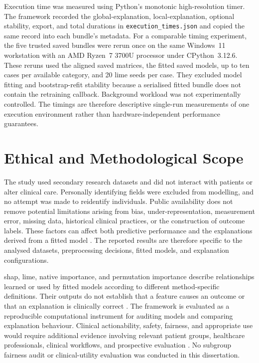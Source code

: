 Execution time was measured using Python's monotonic high-resolution timer. The framework recorded the global-explanation, local-explanation, optional stability, export, and total durations in \texttt{execution\_times.json} and copied the same record into each bundle's metadata. For a comparable timing experiment, the five trusted saved bundles were rerun once on the same Windows~11 workstation with an AMD Ryzen~7 3700U processor under CPython~3.12.6. These reruns used the aligned saved matrices, the fitted saved models, up to ten cases per available category, and 20 \gls{lime} seeds per case. They excluded model fitting and bootstrap-refit stability because a serialised fitted bundle does not contain the retraining callback. Background workload was not experimentally controlled. The timings are therefore descriptive single-run measurements of one execution environment rather than hardware-independent performance guarantees.

\section{Ethical and Methodological Scope}

The study used secondary research datasets and did not interact with patients or alter clinical care. Personally identifying fields were excluded from modelling, and no attempt was made to reidentify individuals. Public availability does not remove potential limitations arising from bias, under-representation, measurement error, missing data, historical clinical practices, or the construction of outcome labels. These factors can affect both predictive performance and the explanations derived from a fitted model \citep{moons_probastai_2025}. The reported results are therefore specific to the analysed datasets, preprocessing decisions, fitted models, and explanation configurations.

\gls{shap}, \gls{lime}, native importance, and permutation importance describe relationships learned or used by fitted models according to different method-specific definitions. Their outputs do not establish that a feature causes an outcome or that an explanation is clinically correct \citep{vilone_classification_2021, tjoa_survey_2021}. The framework is evaluated as a reproducible computational instrument for auditing models and comparing explanation behaviour. Clinical actionability, safety, fairness, and appropriate use would require additional evidence involving relevant patient groups, healthcare professionals, clinical workflows, and prospective evaluation \citep{panigutti_co-design_2023, vasey_decideai_2022}. No subgroup fairness audit or clinical-utility evaluation was conducted in this dissertation.
